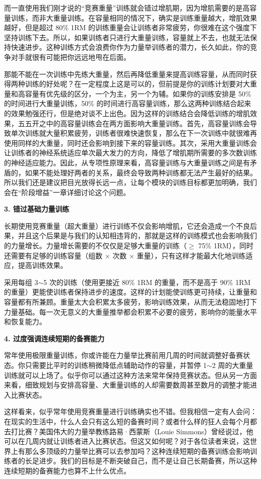 \documentclass[fontset=fandol, a4paper, 12pt, openright]{ctexbook}
\begin{document}
而一直使用我们刚才说的“竞赛重量”训练就会错过增肌期，因为增肌需要的是高容量训练，而非大重量训练。在容量相同的情况下，确实是训练重量越大，增肌效果越好，但是超过 80\% 1RM 的训练重量会让训练者非常疲劳，你很难在这个强度下坚持训练下去。所以，如果训练者只进行大重量训练，容量就上不去，也就无法保持快速进步。这种训练方式会浪费你作为力量举训练者的潜力，长久如此，你的竞争对手就很有可能把你远远地甩在后面。

那能不能在一次训练中先练大重量，然后再降低重量来提高训练容量，从而同时获得两种训练的好处呢？在一定程度上这是可以的，但前提是你的训练计划要对大重量和高容量有优先级的区分，一个为主，另一个为辅。如果你的训练安排是 50\% 的时间进行大重量训练，50\% 的时间进行高容量训练，那么这两种训练结合起来的效果勉强还行，但是绝对谈不上出色。因为这样的训练结合会降低训练的增肌效果，五五开之中的高容量训练会在两方面影响大重量训练。首先，高容量训练会导致单次训练就大量积累疲劳，训练者很难快速恢复，那么在下一次训练中就很难再使用同样的大重量，同时还会影响到接下来的容量训练。其次，采用大重量训练会让训练者的神经系统适应单次最大发力的方向，降低了增肌期所需要的多次数训练的神经适应能力。因此，从专项性原理来看，高容量训练与大重量训练之间是有矛盾的，如果不能处理好两者的关系，最终会导致两种训练都无法产生最好的结果。所以我们还是建议把目光放得长远一点，让每个模块的训练目标都更加明确，我们会在“阶段增益”一章详细讨论这个问题。

\textbf{3. 错过基础力量训练}

长期使用竞赛重量（超大重量）进行训练不仅会影响增肌，它还会造成一个不良后果，并且这个后果是与我们的认知相违背的，那就是这样的训练模式也会影响我们的力量增长。力量增长需要的不仅仅是足够大重量的训练（$\ge$ 75\% 1RM），同时还需要有足够的训练容量（组数 $\times$ 次数 $\times$ 重量），只有这样才能最大化地训练适应，提高训练效果。

采用每组 3$\sim$5 次的训练（使用更接近 80\% 1RM 的重量，而不是高于 90\% 1RM 的重量）更能使训练者保持进步的速度。这样的计划能使训练更可持续，让重量和容量都有所兼顾。重量太大会积累太多疲劳，影响训练效果，从而无法稳固地打下力量基础。每一次无意义的大重量推举都会积累不必要的疲劳，影响你的能量水平和恢复能力。

\textbf{4. 过度强调连续短期的备赛能力}

常年使用极限重量训练，你或许能在力量举比赛前用几周的时间就调整好备赛状态。你只需要比平时的训练稍微降低点辅助动作的容量，并暂停 1$\sim$2 周的大重量训练就可以上场了。似乎你可以通过这种方法来常年保持竞赛状态。但从另一方面来看，细致规划与安排高容量、大重量训练的人却需要数周甚至数月的调整才能进入比赛状态。

这样看来，似乎常年使用竞赛重量进行训练确实也不错。但我相信一定有人会问：在现实的生活中，什么人会只有这么短的备赛时间？或者什么样的狂人会每个月都去打比赛？美国伟大的力量举教练路易·西蒙斯（Louie Simmons）曾经说过，他可以在几周内就让训练者进入比赛状态。但这又如何呢？对于各位读者来说，这世界上有那么多顶级的力量举比赛可以去参加吗？这种连续短期的备赛训练会影响训练者的长足进步。我们的目标是不断突破自己，而不是让自己长期备赛，所以这种连续短期的备赛能力也算不上什么优点。
\end{document}
